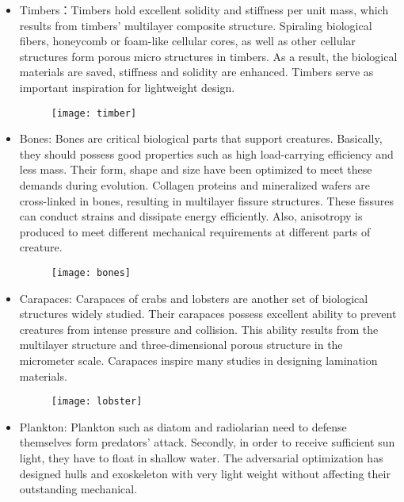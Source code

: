 \begin{itemize}
\item Timbers：Timbers hold excellent solidity and stiffness per unit mass, which results from timbers’ multilayer composite structure. Spiraling biological fibers, honeycomb or foam-like cellular cores, as well as other cellular structures form porous micro structures in timbers. As a result, the biological materials are saved, stiffness and solidity are enhanced. Timbers serve as important inspiration for lightweight design.

\begin{figure}
	\centering
	\texttt{[image: timber]}
	\label{fig:1}
\end{figure}

\item Bones: Bones are critical biological parts that support creatures. Basically, they should possess good properties such as high load-carrying efficiency and less mass. Their form, shape and size have been optimized to meet these demands during evolution. Collagen proteins and mineralized wafers are cross-linked in bones, resulting in multilayer fissure structures. These fissures can conduct strains and dissipate energy efficiently. Also, anisotropy is produced to meet different mechanical requirements at different parts of creature.

\begin{figure}
	\centering
	\texttt{[image: bones]}
	\label{fig:2}
\end{figure}

\item Carapaces: Carapaces of crabs and lobsters are another set of biological structures widely studied. Their carapaces possess excellent ability to prevent creatures from intense pressure and collision. This ability results from the multilayer structure and three-dimensional porous structure in the micrometer scale. Carapaces inspire many studies in designing lamination materials.

\begin{figure}
	\centering
	\texttt{[image: lobster]}
	\label{fig:3}
\end{figure}

\item Plankton: Plankton such as diatom and radiolarian need to defense themselves form predators’ attack. Secondly, in order to receive sufficient sun light, they have to float in shallow water. The adversarial optimization has designed hulls and exoskeleton with very light weight without affecting their outstanding mechanical. \\
\end{itemize}

